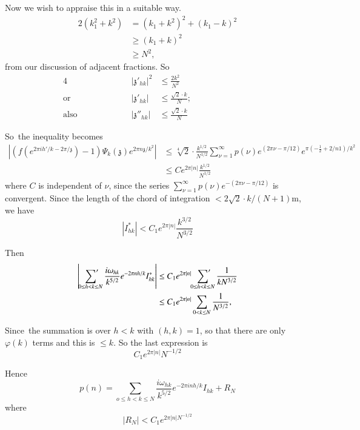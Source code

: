 Now we wish to appraise this in a suitable way.
\begin{align*}
  2(k_1^2 + k^2) & = (k_1+ k^2)^2 + (k_1 - k)^2\\
  & \geq (k_1 +k)^2\\
  & \geq N^2,
\end{align*}
from our discussion of adjacent fractions. So
\begin{alignat*}{4}
  &&|\mathfrak{z}'_{hk}|^2 & \leq \frac{2k^2}{N^2}\\
  \text{or}&\hspace{2cm} & |\mathfrak{z}'_{hk}| & \leq \frac{\sqrt{2}
      \cdot k}{N};\hspace{3cm}\\
  \text{also} && |\mathfrak{z}''_{hk}| & \leq \frac{\sqrt{2}\cdot  k}{N}
\end{alignat*}

So\pageoriginale\ the inequality becomes
\begin{align*}
  \left| \left( f(e^{2 \pi i h'/k- 2 \pi
    /\mathfrak{z}})-1\right)\Psi_k (\mathfrak{z}) e^{2 \pi n
    \mathfrak{z}/k^2}\right| & \leq \sqrt[4]{2} \cdot
  \frac{k^{1/2}}{N^{1/2}} \sum^\infty_{\nu=1} p (\nu) e^{(2 \pi \nu -
    \pi/12)} e^{\pi (- \frac{1}{2} + 2/n 1)/k^2}\\
  & \leq C e^{2 \pi|n|} \frac{k^{1/2}}{N^{1/2}}
\end{align*}
where $C$ is independent of $\nu$, since the series
$\sum\limits^\infty_{\nu=1}p(\nu) e^{- (2 \pi \nu - \pi/12)}$ is
convergent. Since the length of the chord of integration $< 2 \sqrt{2}
\cdot k/(N+1)$m, we have
$$
\left| I^*_{hk} \right| < C_1 e^{2 \pi |n|} \frac{k^{3/2}}{N^{3/2}}
$$

Then 
\begin{align*}
  \left|  \sideset{}{'}\sum_{0 \leq h < k\leq N}  \frac{i \omega_{hk}}{k^{5/2}}
  e^{- 2 \pi n h/k} I^*_{hk} \right| & \leq C_1 e^{2 \pi |n|} \sideset{}{'}\sum_{0
    \leq h < k \leq N} \frac{1}{k N^{3/2}}\\
  & \leq C_1 e^{2 \pi |n|} \sum_{0 < k \leq N} \frac{1}{N^{3/2}},
\end{align*}

Since\pageoriginale\ the summation is over $h < k$ with $(h, k)=1$,
so that there are only $\varphi (k)$ terms and this is $\leq k$. So
the last expression is
$$
C_1 e^{2 \pi |n|} N^{-1/2}
$$

Hence
$$
p(n) = \sum_{o \leq h< k \leq N} \frac{i \omega_{hk}}{k^{5/2}} e^{-
  2\pi in h/k} I_{hk} + R_N
$$
where
$$
|R_N| < C_1 e^{2 \pi |n| N^{- 1/2}}
$$

